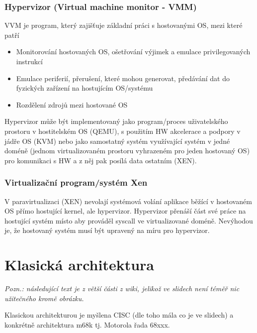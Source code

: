 \documentclass[10pt,a4paper,openright]{article}
\begin{document}
\subsubsection{Hypervizor (Virtual machine monitor - VMM)}
VVM je program, který zajišťuje základní práci s hostovanými OS, mezi které patří
\begin{itemize}
\item Monitorování hostovaných OS, ošetřování výjimek a emulace privilegovaných instrukcí
\item Emulace periferií, přerušení, které mohou generovat, předávání dat do fyzických zařízení na hostujícím OS/systému
\item Rozdělení zdrojů mezi hostované OS
\end{itemize}
Hypervizor může být implementovaný jako program/proces uživatelského prostoru v hostitelském OS (QEMU), s použitím HW akcelerace a podpory v jádře OS (KVM) nebo jako samostatný systém využívající systém v jedné doméně (jednom virtualizovaném prostoru vyhrazeném pro jeden hostovaný OS) pro komunikaci s HW a z něj pak posílá data ostatním (XEN).

\subsubsection{Virtualizační program/systém Xen}
V paravirtualizaci (XEN) nevolají systémová volání aplikace běžící v hostovaném OS přímo hostující kernel, ale hypervizor. Hypervizor přenáší část své práce na hostující systém místo aby prováděl syscall ve virtualizované doméně. Nevýhodou je, že hostovaný systém musí být upravený na míru pro hypervizor.

\section{Klasická architektura}
\textit{Pozn.: následující text je z větší části z wiki, jelikož ve slidech není téměř nic užitečného kromě obrázku.}

Klasickou architekturou je myšlena CISC (dle toho mála co je ve slidech) a konkrétně architektura m68k tj. Motorola řada 68xxx.
\end{document}
